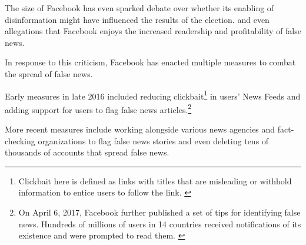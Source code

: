 \par The size of Facebook has even sparked debate over whether its enabling of disinformation might have influenced the results of the election. \cite{bbc_facebook_fake_news_crisis, wp_russian_election_propaganda} and even allegations that Facebook enjoys the increased readership and profitability of false news. \cite{tc_facebook_responsibility}

\par In response to this criticism, Facebook has enacted multiple measures to combat the spread of false news.

\par Early measures in late 2016 included reducing clickbait\footnote{Clickbait here is defined as links with titles that are misleading or withhold information to entice users to follow the link. \cite{fb_reduce_clickbait}} in users' News Feeds \cite{fb_reduce_clickbait} and adding support for users to flag false news articles.\footnote{On April 6, 2017, Facebook further published a set of tips for identifying false news. Hundreds of millions of users in 14 countries received notifications of its existence and were prompted to read them. \cite{fb_spot_fake_news,guardian_fb_tips}} \cite{fb_addressing_hoaxes,tc_fb_down_ranks_fake_news} 

\par More recent measures include working alongside various news agencies and fact-checking organizations to flag false news stories \cite{guardian_steps} and even deleting tens of thousands of accounts that spread false news. \cite{telegraph_fb_delete}